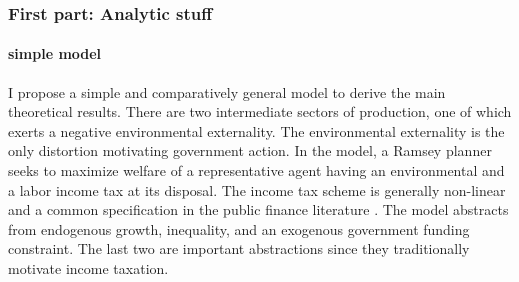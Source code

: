  
\begin{comment}
When labor supply is fixed, environmental taxes alone can establish the efficient allocation in a representative agent economy absent fiscal distortions. Then, such a tax instrument is optimally set to the social cost of an externality, and originators internalize these social costs: the Pigou principle.
However, not redistributing environmental tax revenues reduces consumption below the efficient level and, as I demonstrate, the optimal environmental tax does not follow the Pigou principle.  If, on top, the  labor supply decision is endogenous, the environmental tax alone features too high labor supply. \tr{This results in too high environmental externality. \textbf{To be shown!}}

Lump-sum transfers of environmental tax revenues restore the efficient allocation: as households become richer, labor supply reduces. When lump-sum transfers are not available, the government can establish the efficient allocation by redistributing environmental tax revenues through an income tax scheme which I demonstrate to be progressive.

content...
\end{comment}

\subsubsection*{First part: Analytic stuff}
\paragraph{simple model}
I propose a simple and comparatively general model to derive the main theoretical results. There are two intermediate sectors of production, one of which exerts a negative environmental externality. The environmental externality is the only distortion motivating government action. In the model, a Ramsey planner seeks to maximize welfare of a representative agent having  an environmental and a labor income tax at its disposal. The income tax scheme is generally non-linear and a common specification in the public finance literature \citep[e.g.][]{Benabou2002TaxEfficiency, Heathcote2017OptimalFramework}.
The model abstracts from  endogenous growth, inequality, and an exogenous government funding constraint. The last two are important abstractions since they traditionally motivate income taxation.

